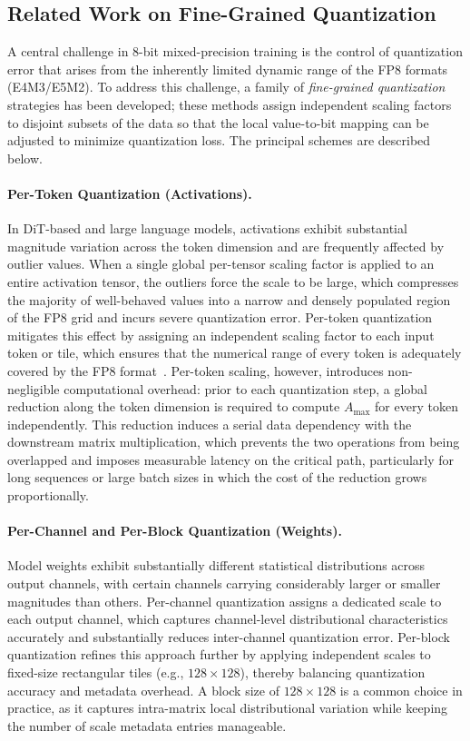 \subsection{Related Work on Fine-Grained Quantization}

A central challenge in 8-bit mixed-precision training is the control of quantization
error that arises from the inherently limited dynamic range of the FP8 formats
(E4M3/E5M2).
To address this challenge, a family of \emph{fine-grained quantization} strategies has
been developed; these methods assign independent scaling factors to disjoint subsets of
the data so that the local value-to-bit mapping can be adjusted to minimize
quantization loss.
The principal schemes are described below.

\paragraph{Per-Token Quantization (Activations).}
In DiT-based and large language models, activations exhibit substantial magnitude
variation across the token dimension and are frequently affected by outlier values.
When a single global per-tensor scaling factor is applied to an entire activation
tensor, the outliers force the scale to be large, which compresses the majority of
well-behaved values into a narrow and densely populated region of the FP8 grid and
incurs severe quantization error.
Per-token quantization mitigates this effect by assigning an independent scaling factor
to each input token or tile, which ensures that the numerical range of every token is
adequately covered by the FP8 format~\cite{micikevicius2022fp8}.
Per-token scaling, however, introduces non-negligible computational overhead: prior to
each quantization step, a global reduction along the token dimension is required to
compute $A_{\max}$ for every token independently.
This reduction induces a serial data dependency with the downstream matrix
multiplication, which prevents the two operations from being overlapped and imposes
measurable latency on the critical path, particularly for long sequences or large batch
sizes in which the cost of the reduction grows proportionally.

\paragraph{Per-Channel and Per-Block Quantization (Weights).}
Model weights exhibit substantially different statistical distributions across output
channels, with certain channels carrying considerably larger or smaller magnitudes than
others.
Per-channel quantization assigns a dedicated scale to each output channel, which
captures channel-level distributional characteristics accurately and substantially
reduces inter-channel quantization error.
Per-block quantization refines this approach further by applying independent scales to
fixed-size rectangular tiles (e.g., $128\!\times\!128$), thereby balancing
quantization accuracy and metadata overhead.
A block size of $128\!\times\!128$ is a common choice in practice, as it captures
intra-matrix local distributional variation while keeping the number of scale metadata
entries manageable.

